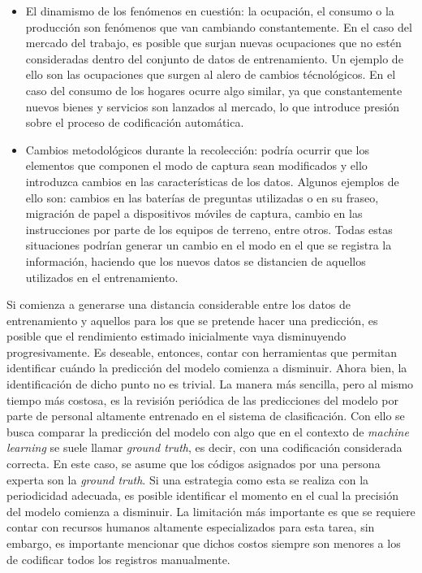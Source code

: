 \documentclass[
  12pt,
  spanish,
]{article}
\begin{document}
\begin{itemize}
\item
  El dinamismo de los fenómenos en cuestión: la ocupación, el consumo o
  la producción son fenómenos que van cambiando constantemente. En el
  caso del mercado del trabajo, es posible que surjan nuevas ocupaciones
  que no estén consideradas dentro del conjunto de datos de
  entrenamiento. Un ejemplo de ello son las ocupaciones que surgen al
  alero de cambios técnológicos. En el caso del consumo de los hogares
  ocurre algo similar, ya que constantemente nuevos bienes y servicios
  son lanzados al mercado, lo que introduce presión sobre el proceso de
  codificación automática.
\item
  Cambios metodológicos durante la recolección: podría ocurrir que los
  elementos que componen el modo de captura sean modificados y ello
  introduzca cambios en las características de los datos. Algunos
  ejemplos de ello son: cambios en las baterías de preguntas utilizadas
  o en su fraseo, migración de papel a dispositivos móviles de captura,
  cambio en las instrucciones por parte de los equipos de terreno, entre
  otros. Todas estas situaciones podrían generar un cambio en el modo en
  el que se registra la información, haciendo que los nuevos datos se
  distancien de aquellos utilizados en el entrenamiento.
\end{itemize}

Si comienza a generarse una distancia considerable entre los datos de
entrenamiento y aquellos para los que se pretende hacer una predicción,
es posible que el rendimiento estimado inicialmente vaya disminuyendo
progresivamente. Es deseable, entonces, contar con herramientas que
permitan identificar cuándo la predicción del modelo comienza a
disminuir. Ahora bien, la identificación de dicho punto no es trivial.
La manera más sencilla, pero al mismo tiempo más costosa, es la revisión
periódica de las predicciones del modelo por parte de personal altamente
entrenado en el sistema de clasificación. Con ello se busca comparar la
predicción del modelo con algo que en el contexto de \emph{machine
learning} se suele llamar \emph{ground truth}, es decir, con una
codificación considerada correcta. En este caso, se asume que los
códigos asignados por una persona experta son la \emph{ground truth}. Si
una estrategia como esta se realiza con la periodicidad adecuada, es
posible identificar el momento en el cual la precisión del modelo
comienza a disminuir. La limitación más importante es que se requiere
contar con recursos humanos altamente especializados para esta tarea,
sin embargo, es importante mencionar que dichos costos siempre son
menores a los de codificar todos los registros manualmente.
\end{document}
